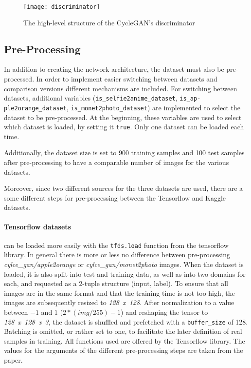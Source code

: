 \documentclass[fleqn,10pt]{SelfArx} %
\begin{document}
\begin{figure*}[htb] 
	\centering 
	\texttt{[image: discriminator]}
	\caption{The high-level structure of the Cycle\ac{GAN}'s discriminator \cite{Introduction-to-Cycle-GANs}}
	\label{fig:discriminator}
\end{figure*}

\subsection{Pre-Processing}
In addition to creating the network architecture, the dataset must also be pre-processed. In order to implement easier switching between datasets and comparison versions different mechanisms are included. For switching between datasets, additional variables (\texttt{is\_selfie2anime\_dataset}, \texttt{is\_ap- ple2orange\_dataset}, \texttt{is\_monet2photo\_dataset}) are implemented to select the dataset to be pre-processed. At the beginning, these variables are used to select which dataset is loaded, by setting it \texttt{true}. Only one dataset can be loaded each time.

Additionally, the dataset size is set to 900 training samples and 100 test samples after pre-processing to have a comparable number of images for the various datasets. 

Moreover, since two different sources for the three datasets are used, there are a some different steps for pre-processing between the Tensorflow and Kaggle datasets. 

\paragraph{Tensorflow datasets} can be loaded more easily with the \texttt{tfds.load} function from the tensorflow library. In general there is more or less no difference between pre-processing \textit{cylce\_gan/apple2orange} or \textit{cylce\_gan/monet2photo} images. When the dataset is loaded, it is also split into test and training data, as well as into two domains for each, and requested as a 2-tuple structure (input, label). To ensure that all images are in the same format and that the training time is not too high, the images are subsequently resized to \textit{128~x~128}. After normalization to a value between $-1$ and $1$ ($2 * (img / 255) - 1$) and reshaping the tensor to \textit{128~x~128~x~3}, the dataset is shuffled and prefetched with a \texttt{buffer\_size} of 128. Batching is omitted, or rather set to one, to facilitate the later definition of real samples in training. All functions used are offered by the Tensorflow library. The values for the arguments of the different pre-processing steps are taken from the paper.~\cite{image-to-image-ccan}
\end{document}

